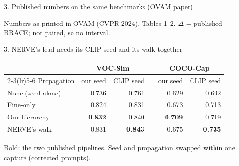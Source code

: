 \documentclass[aspectratio=169,11pt]{beamer}
\newcommand{\src}[1]{\par\vspace{0.3em}{\footnotesize Source: #1}}
\newenvironment{slidetable}{\begin{center}\small\renewcommand{\arraystretch}{1.12}}{\end{center}}
\begin{document}
\begin{frame}{3. Published numbers on the same benchmarks (OVAM paper)}
\begin{slidetable}
\renewcommand{\arraystretch}{1.0}
\end{slidetable}
{\footnotesize Numbers as printed in OVAM (CVPR 2024), Tables 1--2. $\Delta$ = published $-$ BRACE; not paired, so no interval.}
\end{frame}

\begin{frame}{3. NERVE's lead needs its CLIP seed and its walk together}
\begin{slidetable}
\begin{tabular}{lrrcrr}
\toprule
 & \multicolumn{2}{c}{VOC-Sim} & & \multicolumn{2}{c}{COCO-Cap} \\
\cmidrule(lr){2-3}\cmidrule(lr){5-6}
Propagation & our seed & CLIP seed & & our seed & CLIP seed \\
\midrule
None (seed alone)  & 0.736 & 0.761 & & 0.629 & 0.692 \\
Fine-only          & 0.824 & 0.831 & & 0.673 & 0.713 \\
Our hierarchy      & \textbf{0.832} & 0.840 & & \textbf{0.709} & 0.719 \\
NERVE's walk       & 0.831 & \textbf{0.843} & & 0.675 & \textbf{0.735} \\
\bottomrule
\end{tabular}
\end{slidetable}
Bold: the two published pipelines. Seed and propagation swapped within one capture (corrected prompts).
\src{runs/20\_new\_reruns/result.md; workplan Entry 16}
\end{frame}
\end{document}

